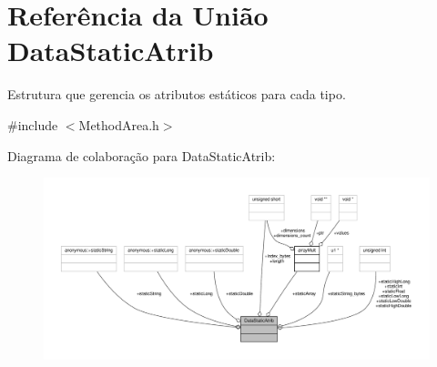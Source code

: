 \hypertarget{unionDataStaticAtrib}{}\section{Referência da União Data\+Static\+Atrib}
\label{unionDataStaticAtrib}


Estrutura que gerencia os atributos estáticos para cada tipo.  




{\ttfamily \#include $<$Method\+Area.\+h$>$}



Diagrama de colaboração para Data\+Static\+Atrib\+:
\nopagebreak
\begin{figure}[H]
\begin{center}
\leavevmode
\includegraphics[width=350pt]{unionDataStaticAtrib__coll__graph}
\end{center}
\end{figure}
